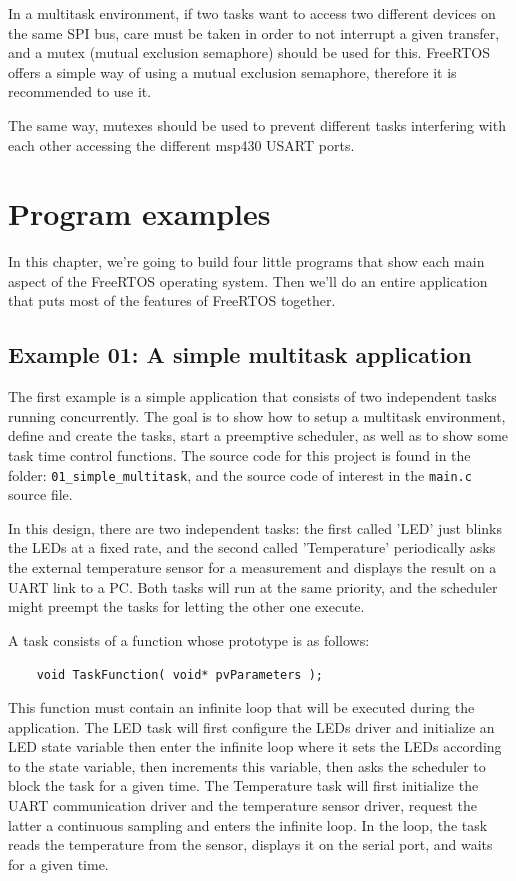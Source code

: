 \documentclass[11pt]{report}
\begin{document}
In a multitask environment, if two tasks want to access two different devices on the same SPI bus, care must be taken in order to not interrupt a given transfer, and a mutex (mutual exclusion semaphore) should be used for this. FreeRTOS offers a simple way of using a mutual exclusion semaphore, therefore it is recommended to use it.

The same way, mutexes should be used to prevent different tasks interfering with each other accessing the different msp430 USART ports.


\chapter{Program examples}

In this chapter, we're going to build four little programs that show each main aspect of the FreeRTOS operating system. Then we'll do an entire application that puts most of the features of FreeRTOS together.

\section{Example 01: A simple multitask application}

The first example is a simple application that consists of two independent tasks running concurrently. The goal is to show how to setup a multitask environment, define and create the tasks, start a preemptive scheduler, as well as to show some task time control functions. The source code for this project is found in the folder: \verb$01_simple_multitask$, and the source code of interest in the \verb$main.c$ source file.


In this design, there are two independent tasks: the first called 'LED' just blinks the LEDs at a fixed rate, and the second called 'Temperature' periodically asks the external temperature sensor for a measurement and displays the result on a UART link to a PC. Both tasks will run at the same priority, and the scheduler might preempt the tasks for letting the other one execute.

A task consists of a function whose prototype is as follows:

\verb$    void TaskFunction( void* pvParameters );$

This function must contain an infinite loop that will be executed during the application. The LED task will first configure the LEDs driver and initialize an LED state variable then enter the infinite loop where it sets the LEDs according to the state variable, then increments this variable, then asks the scheduler to block the task for a given time. The Temperature task will first initialize the UART communication driver and the temperature sensor driver, request the latter a continuous sampling and enters the infinite loop. In the loop, the task reads the temperature from the sensor, displays it on the serial port, and waits for a given time.
\end{document}
